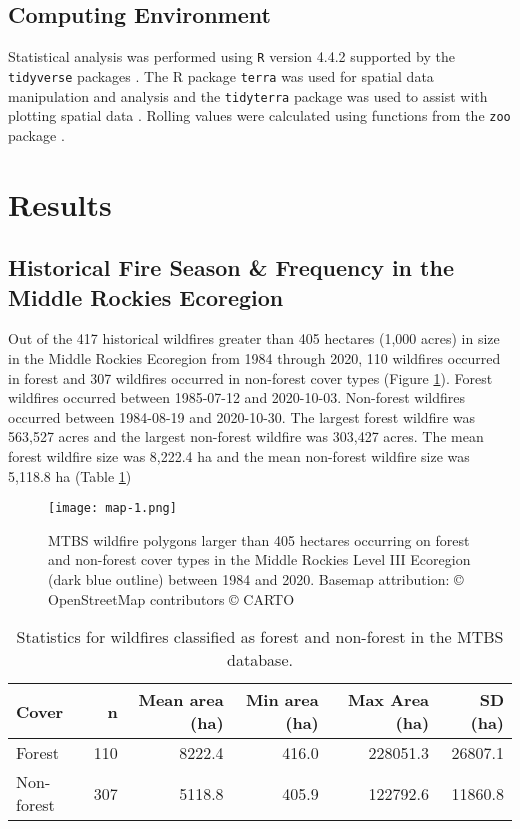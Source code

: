 \documentclass[11p]{article}
\begin{document}
\subsection{Computing Environment}

Statistical analysis was performed using \texttt{R} version 4.4.2 \citep{rcoreteamLanguageEnvironmentStatistical2024} supported by the \texttt{tidyverse} packages \citep{hernangomezUsingTidyverseTerra2023} . The R package \texttt{terra} was used for spatial data manipulation and analysis \citep{hijmansTerraSpatialData2024} and the \texttt{tidyterra} package was used to assist with plotting spatial data \citep{hernangomezUsingTidyverseTerra2023}. Rolling values were calculated using functions from the \texttt{zoo} package \citep{zeileisZooS3Infrastructure2005}.  

\section{Results}

\subsection{Historical Fire Season \& Frequency in the Middle Rockies Ecoregion}

Out of the 417 historical wildfires greater than 405 hectares (1,000 acres) in size in the Middle Rockies Ecoregion from 1984 through 2020, 110 wildfires occurred in forest and 307 wildfires occurred in non-forest cover types (Figure \ref{fig:map}). Forest wildfires occurred between 1985-07-12 and 2020-10-03. Non-forest wildfires occurred between 1984-08-19 and 2020-10-30. The largest forest wildfire was 563,527 acres and the largest non-forest wildfire was 303,427 acres. The mean forest wildfire size was 8,222.4 ha and the mean non-forest wildfire size was 5,118.8 ha (Table \ref{tab:mtbs-stats})

\begin{figure}[htbp]
  \texttt{[image: map-1.png]}
  \caption{MTBS wildfire polygons larger than 405 hectares occurring on forest and non-forest cover types in the Middle Rockies Level III Ecoregion (dark blue outline) between 1984 and 2020. Basemap attribution: © OpenStreetMap contributors © CARTO}
  \label{fig:map}
\end{figure}

\begin{table}
  \centering
  \begin{tabular}{lrrrrr}
    \hline
    Cover      & n   & Mean area (ha) & Min area (ha) & Max Area (ha) & SD (ha) \\
    \hline
    Forest     & 110 & 8222.4         & 416.0         & 228051.3      & 26807.1 \\
    Non-forest & 307 & 5118.8         & 405.9         & 122792.6      & 11860.8  \\
  \end{tabular}
  \caption{Statistics for wildfires classified as forest and non-forest in the MTBS database.}
  \label{tab:mtbs-stats}
\end{table}
\end{document}

